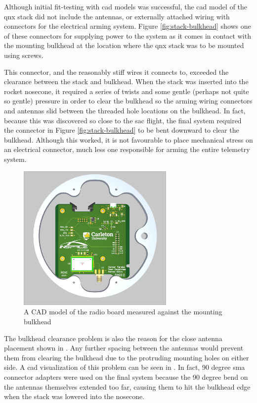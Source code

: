 Although initial fit-testing with \gls{cad} models was successful, the \gls{cad} model of the \gls{qnx} stack did not
include the antennas, or externally attached wiring with connectors for the electrical arming system. Figure
\ref{fig:stack-bulkhead} shows one of these connectors for supplying power to the system as it comes in contact with
the mounting bulkhead at the location where the \gls{qnx} stack was to be mounted using screws.

This connector, and the reasonably stiff wires it connects to, exceeded the clearance between the stack and bulkhead.
When the stack was inserted into the rocket nosecone, it required a series of twists and some gentle (perhaps not quite
so gentle) pressure in order to clear the bulkhead so the arming wiring connectors and antennas slid between the
threaded hole locations on the bulkhead. In fact, because this was discovered so close to the \gls{sac} flight, the
final system required the connector in Figure \ref{fig:stack-bulkhead} to be bent downward to clear the bulkhead.
Although this worked, it is not favourable to place mechanical stress on an electrical connector, much less one
responsible for arming the entire telemetry system.

\begin{figure}[H]
    \center
    \includegraphics[width=3in]{assets/images/rad-cad.png}
    \caption{A CAD model of the radio board measured against the mounting bulkhead}
    \label{fig:rad-cad}
\end{figure}

The bulkhead clearance problem is also the reason for the close antenna placement shown in .
Any further spacing between the antennas would prevent them from clearing the bulkhead due to the protruding mounting
holes on either side. A \gls{cad} visualization of this problem can be seen in . In fact, 90 degree
\gls{sma} connector adapters were used on the final system because the 90 degree bend on the antennas themselves
extended too far, causing them to hit the bulkhead edge when the stack was lowered into the nosecone.

